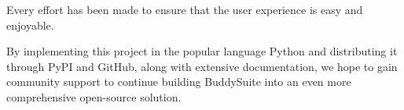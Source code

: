 \documentclass[twocolumn]{bmcart}%
\begin{document}
Every effort has been made to ensure that the user experience is easy and enjoyable. 

By implementing this project in the popular language Python and distributing it through PyPI and GitHub, along with extensive documentation, we hope to gain community support to continue building BuddySuite into an even more comprehensive open-source solution.


\end{document}
